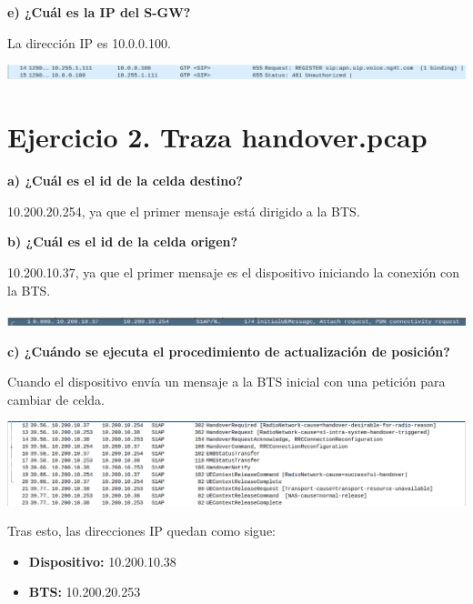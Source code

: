 \documentclass{article}
\begin{document}
\textbf{e) ¿Cuál es la IP del S-GW?}

La dirección IP es 10.0.0.100.

\begin{center}
\includegraphics[scale=0.3]{images/SGW.png}
\end{center}

\section{Ejercicio 2. Traza handover.pcap}

\textbf{a) ¿Cuál es el id de la celda destino?}

10.200.20.254, ya que el primer mensaje está dirigido a la BTS.

\textbf{b) ¿Cuál es el id de la celda origen?}

10.200.10.37, ya que el primer mensaje es el dispositivo iniciando la conexión con la BTS.

\begin{center}
\includegraphics[scale=0.3]{images/celdaDestino.png} 
\end{center}

\textbf{c) ¿Cuándo se ejecuta el procedimiento de actualización de posición?}

Cuando el dispositivo envía un mensaje a la BTS inicial con una petición para cambiar de celda.

\begin{center}
\includegraphics[scale=0.27]{images/handover.png} 
\end{center}

Tras esto, las direcciones IP quedan como sigue:

\begin{itemize}
\item \textbf{Dispositivo:} 10.200.10.38
\item \textbf{BTS:} 10.200.20.253
\end{itemize}
\end{document}
